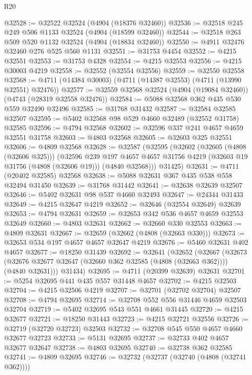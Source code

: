 \begin{lexlean}{R20}
\begin{coremodule}
@32528 := @32522 @32524 (@4904 (@18376 @32460))
@32536 := @32518 @245 @249 @506 @1133 @32524 (@4904 (@18599 @32460))
@32544 := @32518 @263 @509 @520 @1132 @32524 (@4904 (@18834 @32460))
@32550 := @4911 @32476 @32460 @276 @525 @560 @1131
@32551 := @31753 @4454
@32552 := @4215 @32551
@32553 := @31753 @4328
@32554 := @4215 @32553
@32556 := @4215 @30003 @4219
@32558 := @32552 (@32554 @32556)
@32559 := @32550 @32558
@32568 := @4711 (@14384 @30003) (@4711 (@14387 @32553) (@4711 (@13990 @32551) @32476))
@32577 := @32559 @32568 @32524 (@4904 (@19084 @32460)) (@4743 (@28319 @32558 @32476))
@32584 := @5088 @32568 @362 @435 @530 @559 @32490 @32496
@32585 := @31768 @31432
@32587 := @32584 @32585 @32507
@32595 := @5402 @32568 @98 @529 @4660 @32489 (@32552 @31758) @32585
@32596 := @4794 @32568
@32602 := @32596 @337 @241 @4657 @4659 @32551 @31758
@32603 := @4803 @32568
@32605 := @32603 @325 @32551
@32606 := @4809 @32568
@32628 := @32587
    (@32595
      (@32602
        (@32605 (@4808 (@32606 @325)))
        (@32596
          @239
          @197
          @4657
          @4657
          @31756
          @4219
          (@32603 @19 @31756 (@4808 (@32606 @19)))
          (@4840 @32568)))
      @31425)
@32631 := @4711 (@20402 @32585) @32568
@32638 := @5088 @32631 @367 @435 @538 @558 @32494 @31450
@32639 := @31768 @31442
@32641 := @32638 @32639 @32507
@32646 := @5402 @32631 @98 @537 @4660 @32493
@32647 := @24344 @31433
@32649 := @4215 @32647 @4219
@32652 := @32646 (@32554 @32649) @32639
@32653 := @4794 @32631
@32659 := @32653 @342 @536 @4657 @4659 @32553 @32649
@32660 := @4803 @32631
@32662 := @32660 @330 @32553
@32663 := @4809 @32631
@32667 := @32659 (@32662 (@4808 (@32663 @330)))
@32673 := @32653 @534 @197 @4657 @4657 @32647 @4219
@32676 := @5460 @32631 @402 @4657
@32677 := @18250 @31439
@32692 := @32641
    (@32652
      (@32667
        (@32673 (@32676 @32677 @32647 (@32660 @362 @32585 (@4808 (@32663 @362)))) (@4840 @32631)))
      @31434)
@32695 := @4711 (@20399 @32639) @32631
@32701 := @5254 @32695 @441 @435 @557 @31448 @4657
@32702 := @4215 @32503
@32704 := @4215 @32506 @4219
@32707 := @32701 (@32702 @32704) @32507
@32708 := @4794 @32695
@32714 := @32708 @552 @556 @31446 @4659 @32503 @32704
@32719 := @5402 @32695 @543 @551 @4661 @31445
@32720 := @4215 @32677
@32721 := @18250 @31443
@32723 := @4215 @32721 @32556
@32726 := @32719 (@32720 @32723) @32503
@32732 := @32708 @545 @550 @4657 @4660 @32677 @32723
@32733 := @5131 @32695
@32737 := @32733 @402 @4657 @32677 @32647
@32738 := @4803 @32695
@32740 := @32738 @362 @32585
@32741 := @4809 @32695
@32746 := @32732 (@32737 (@32740 (@4808 (@32741 @362))))

\end{coremodule}
\end{lexlean}
